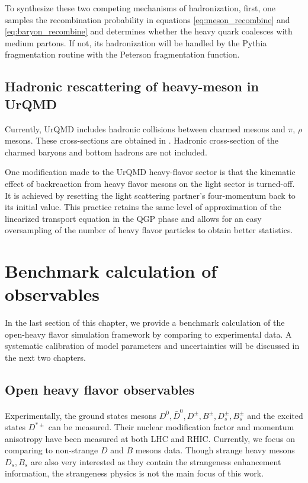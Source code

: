 To synthesize these two competing mechanisms of hadronization, first, one samples the recombination probability in equations \ref{eq:meson_recombine} and \ref{eq:baryon_recombine} and determines whether the heavy quark coalesces with medium partons. 
If not, its hadronization will be handled by the Pythia fragmentation routine with the Peterson fragmentation function.

\subsection{Hadronic rescattering of heavy-meson in UrQMD}
Currently, UrQMD includes hadronic collisions between charmed mesons and $\pi$, $\rho$ mesons.
These cross-sections are obtained in \cite{Lin:2000jp}.
Hadronic cross-section of the charmed baryons and bottom hadrons are not included.

One modification made to the UrQMD heavy-flavor sector is that the kinematic effect of backreaction from heavy flavor mesons on the light sector is turned-off. 
It is achieved by resetting the light scattering partner's four-momentum back to its initial value.
This practice retains the same level of approximation of the linearized transport equation in the QGP phase and allows for an easy oversampling of the number of heavy flavor particles to obtain better statistics.

\section{Benchmark calculation of observables}
\label{section:benchmark}
In the last section of this chapter, we provide a benchmark calculation of the open-heavy flavor simulation framework by comparing to experimental data. 
A systematic calibration of model parameters and uncertainties will be discussed in the next two chapters.

\subsection{Open heavy flavor observables}
Experimentally, the ground states mesons $D^0, \bar{D}^0, D^{\pm}, B^{\pm}, D_s^{\pm}, B_s^{\pm}$ and the excited states $D^{*\pm}$ can be measured. 
Their nuclear modification factor and momentum anisotropy have been measured at both LHC and RHIC.
Currently, we focus on comparing to non-strange $D$ and $B$ mesons data.
Though strange heavy mesons $D_s, B_s$ are also very interested as they contain the strangeness enhancement information, the strangeness physics is not the main focus of this work.

